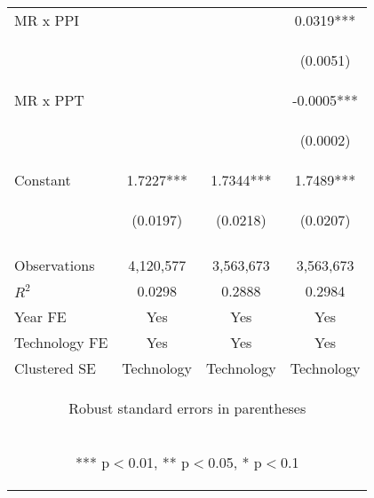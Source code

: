 \begin{center}
\begin{tabular}{lccc}
MR x PPI &  &  & 0.0319*** \\
\vspace{4pt} & \begin{footnotesize}\end{footnotesize} & \begin{footnotesize}\end{footnotesize} & \begin{footnotesize}(0.0051)\end{footnotesize} \\
MR x PPT &  &  & -0.0005*** \\
\vspace{4pt} & \begin{footnotesize}\end{footnotesize} & \begin{footnotesize}\end{footnotesize} & \begin{footnotesize}(0.0002)\end{footnotesize} \\
Constant & 1.7227*** & 1.7344*** & 1.7489*** \\
 & \begin{footnotesize}(0.0197)\end{footnotesize} & \begin{footnotesize}(0.0218)\end{footnotesize} & \begin{footnotesize}(0.0207)\end{footnotesize} \\
\vspace{4pt} & \begin{footnotesize}\end{footnotesize} & \begin{footnotesize}\end{footnotesize} & \begin{footnotesize}\end{footnotesize} \\
Observations & 4,120,577 & 3,563,673 & 3,563,673 \\
$R^2$ & 0.0298 & 0.2888 & 0.2984 \\
Year FE & Yes & Yes & Yes \\
Technology FE & Yes & Yes & Yes \\
 Clustered SE & Technology & Technology & Technology \\ \hline
\multicolumn{4}{c}{\begin{footnotesize} Robust standard errors in parentheses\end{footnotesize}} \\
\multicolumn{4}{c}{\begin{footnotesize} *** p$<$0.01, ** p$<$0.05, * p$<$0.1\end{footnotesize}} \\
\end{tabular}
\end{center}
